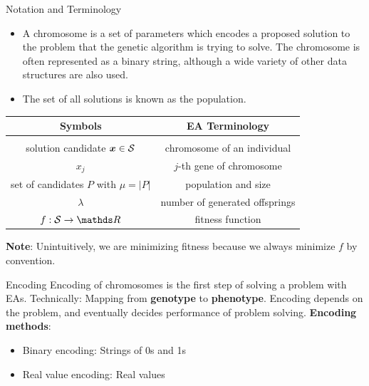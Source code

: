 \documentclass[11pt,compress,t,notes=noshow, xcolor=table]{beamer}
\begin{document}
\begin{framev}[fs=small]{Notation and Terminology}
\begin{itemize}
\item A chromosome is a set of parameters which encodes a proposed solution to the problem that the genetic algorithm is trying to solve. The chromosome is often represented as a binary string, although a wide variety of other data structures are also used.\\
\item The set of all solutions is known as the population.
\end{itemize}
\spacer
\begin{center}
\begin{tabular}{c|c}
\textbf{Symbols} & \textbf{EA Terminology} \\
\hline\hline \\
solution candidate $\bm{x} \in \mathcal{S}$ & chromosome of an individual \\ [0.2em]
$x_j$  & $j$-th gene of chromosome \\[0.2em]
set of candidates $P$ with $\mu = |P|$ & population and size \\[0.2em]
$\lambda$ & number of generated offsprings \\[0.2em]
$f: \S \to \R$ & fitness function
\end{tabular}
\end{center}
\textbf{Note}: Unintuitively, we are minimizing fitness because we always minimize $f$ by convention.
\end{framev}


\begin{framev}{Encoding}
Encoding of chromosomes is the first step of solving a problem with EAs.
Technically: Mapping from \textbf{genotype} to \textbf{phenotype}.
Encoding depends on the problem, and eventually decides performance of problem solving.
\textbf{Encoding methods}:
\begin{itemize}
\item Binary encoding: Strings of 0s and 1s
\item Real value encoding: Real values
\end{itemize}
\end{framev}
\end{document}
